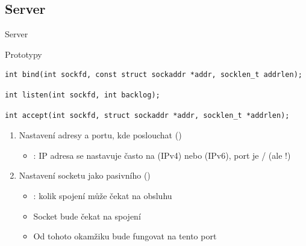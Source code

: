 \subsection*{Server}
\frame{\subsectionpage}

\begin{frame}[fragile]{Server}

  \begin{block}{Prototypy}
  \begin{lstlisting}[columns=fullflexible,aboveskip=2pt,belowskip=0pt]
int bind(int sockfd, const struct sockaddr *addr, socklen_t addrlen);
  \end{lstlisting}
  \begin{lstlisting}[columns=fullflexible,aboveskip=0pt,belowskip=0pt]
int listen(int sockfd, int backlog);
  \end{lstlisting}
  \begin{lstlisting}[columns=fullflexible,aboveskip=0pt,belowskip=2pt]
int accept(int sockfd, struct sockaddr *addr, socklen_t *addrlen);
  \end{lstlisting}
  \end{block}


  \begin{enumerate}
    \item Nastavení adresy a portu, kde poslouchat ()
    \begin{itemize}
      \item {}: IP adresa se nastavuje často na 
	(IPv4) nebo  (IPv6), port je
	/ (ale !)
    \end{itemize}

    \pause

    \item Nastavení socketu jako pasivního ()
    \begin{itemize}
      \item {}: kolik spojení může čekat na obsluhu

      \pause

      \item Socket bude čekat na spojení
      \item Od tohoto okamžiku bude fungovat  na tento port
    \end{itemize}

    \pause


\end{enumerate}
\end{frame}
